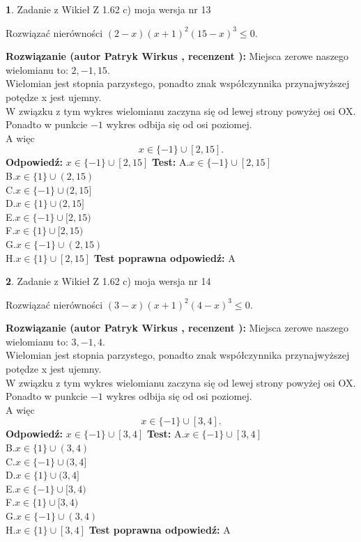 \documentclass[12pt, a4paper]{article}
\theoremstyle{definition} %
\newtheorem{zad}{}
\newcommand{\zadStart}[1]{\begin{zad}#1\newline}
\newcommand{\zadStop}{\end{zad}}
\newcommand{\rozwStart}[2]{\noindent \textbf{Rozwiązanie (autor #1 , recenzent #2): }\newline}
\newcommand{\rozwStop}{\newline}
\newcommand{\odpStart}{\noindent \textbf{Odpowiedź:}\newline}
\newcommand{\odpStop}{\newline}
\newcommand{\testStart}{\noindent \textbf{Test:}\newline}
\newcommand{\testStop}{\newline}
\newcommand{\kluczStart}{\noindent \textbf{Test poprawna odpowiedź:}\newline}
\newcommand{\kluczStop}{\newline}
\begin{document}
\zadStart{Zadanie z Wikieł Z 1.62 c) moja wersja nr 13}

Rozwiązać nierówności $(2-x)(x+1)^{2}(15-x)^{3}\le0$.
\zadStop
\rozwStart{Patryk Wirkus}{}
Miejsca zerowe naszego wielomianu to: $2, -1, 15$.\\
Wielomian jest stopnia parzystego, ponadto znak współczynnika przy\linebreak najwyższej potędze x jest ujemny.\\ W związku z tym wykres wielomianu zaczyna się od lewej strony powyżej osi OX.\\
Ponadto w punkcie $-1$ wykres odbija się od osi poziomej.\\
A więc $$x \in \{-1\} \cup [2,15].$$
\rozwStop
\odpStart
$x \in \{-1\} \cup [2,15]$
\odpStop
\testStart
A.$x \in \{-1\} \cup [2,15]$\\
B.$x \in \{1\} \cup (2,15)$\\
C.$x \in \{-1\} \cup (2,15]$\\
D.$x \in \{1\} \cup (2,15]$\\
E.$x \in \{-1\} \cup [2,15)$\\
F.$x \in \{1\} \cup [2,15)$\\
G.$x \in \{-1\} \cup (2,15)$\\
H.$x \in \{1\} \cup [2,15]$
\testStop
\kluczStart
A
\kluczStop



\zadStart{Zadanie z Wikieł Z 1.62 c) moja wersja nr 14}

Rozwiązać nierówności $(3-x)(x+1)^{2}(4-x)^{3}\le0$.
\zadStop
\rozwStart{Patryk Wirkus}{}
Miejsca zerowe naszego wielomianu to: $3, -1, 4$.\\
Wielomian jest stopnia parzystego, ponadto znak współczynnika przy\linebreak najwyższej potędze x jest ujemny.\\ W związku z tym wykres wielomianu zaczyna się od lewej strony powyżej osi OX.\\
Ponadto w punkcie $-1$ wykres odbija się od osi poziomej.\\
A więc $$x \in \{-1\} \cup [3,4].$$
\rozwStop
\odpStart
$x \in \{-1\} \cup [3,4]$
\odpStop
\testStart
A.$x \in \{-1\} \cup [3,4]$\\
B.$x \in \{1\} \cup (3,4)$\\
C.$x \in \{-1\} \cup (3,4]$\\
D.$x \in \{1\} \cup (3,4]$\\
E.$x \in \{-1\} \cup [3,4)$\\
F.$x \in \{1\} \cup [3,4)$\\
G.$x \in \{-1\} \cup (3,4)$\\
H.$x \in \{1\} \cup [3,4]$
\testStop
\kluczStart
A
\kluczStop
\end{document}
